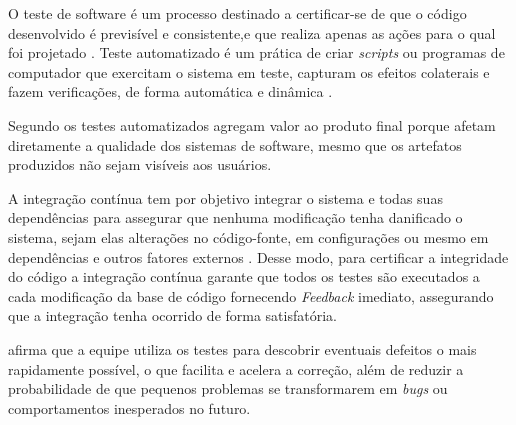 O teste de software é um processo destinado a certificar-se de que o código desenvolvido é previsível e consistente,e que realiza apenas as ações para o qual foi projetado \cite{myers2011art}. Teste automatizado é um prática de criar \textit{scripts} ou programas de computador que exercitam o sistema em teste, capturam os efeitos colaterais e fazem verificações, de forma automática e dinâmica \cite{meszaros2007xunit}.

Segundo  os testes automatizados agregam valor ao produto final porque afetam diretamente a qualidade dos sistemas de software, mesmo que os artefatos produzidos não sejam visíveis aos usuários.

A integração contínua tem por objetivo integrar o sistema e todas suas dependências para assegurar que nenhuma modificação tenha danificado o sistema, sejam elas alterações no código-fonte, em configurações ou mesmo em dependências e outros fatores externos \cite{duvall2007continuous}. Desse modo, para certificar a integridade do código a integração contínua garante que todos os testes são executados a cada modificação da base de código fornecendo \textit{Feedback} imediato, assegurando que a integração tenha ocorrido de forma satisfatória.

 afirma que a equipe utiliza os testes para descobrir eventuais defeitos o mais rapidamente possível, o que facilita e acelera a correção, além de reduzir a probabilidade de que pequenos problemas se transformarem em \textit{bugs} ou comportamentos inesperados no futuro.


